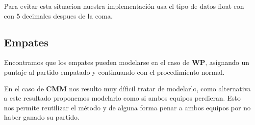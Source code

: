Para evitar esta situacion nuestra implementación usa el tipo de datos float con con 5 decimales despues de la coma.\\


\subsection{Empates}

Encontramos que los empates pueden modelarse en el caso de \textbf{WP}, asignando un puntaje al partido empatado y continuando con el procedimiento normal.

En el caso de \textbf{CMM} nos resulto muy díficil tratar de modelarlo, como alternativa a este resultado proponemos modelarlo como si ambos equipos perdieran. Esto nos permite 
reutilizar el método y de alguna forma penar a ambos equipos por no haber ganado su partido.
















